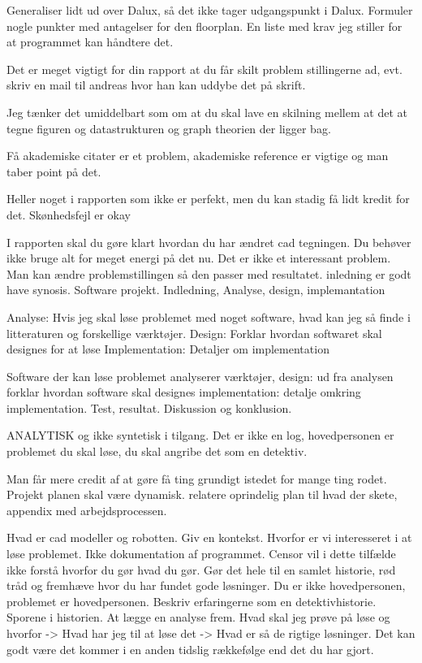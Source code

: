 Generaliser lidt ud over Dalux, så det ikke tager udgangspunkt i Dalux.
Formuler nogle punkter med antagelser for den floorplan. 
En liste med krav jeg stiller for at programmet kan håndtere det.


Det er meget vigtigt for din rapport at du får skilt problem stillingerne ad, evt. skriv en mail til andreas hvor han kan uddybe det på skrift.

Jeg tænker det umiddelbart som om at du skal lave en skilning mellem at det at tegne figuren og datastrukturen og graph theorien der ligger bag. 


Få akademiske citater er et problem, akademiske reference er vigtige og man taber point på det.

Heller noget i rapporten som ikke er perfekt, men du kan stadig få lidt kredit for det. Skønhedsfejl er okay

I rapporten skal du gøre klart hvordan du har ændret cad tegningen. Du behøver ikke bruge alt for meget energi på det nu. Det er ikke et interessant problem.
Man kan ændre problemstillingen så den passer med resultatet.
inledning er godt have synosis.
Software projekt. Indledning,  Analyse,  design, implemantation

Analyse: Hvis jeg skal løse problemet med noget software, hvad kan jeg så finde i litteraturen og forskellige værktøjer.
Design: Forklar hvordan softwaret skal designes for at løse 
Implementation: Detaljer om implementation

Software der kan løse problemet analyserer værktøjer, 
design: ud fra analysen forklar hvordan software skal designes 
implementation: detalje omkring implementation.
Test, resultat. Diskussion og konklusion.

ANALYTISK og ikke syntetisk i tilgang.
Det er ikke en log, hovedpersonen er problemet du skal løse, du skal angribe det som en detektiv. 

Man får mere credit af at gøre få ting grundigt istedet for mange ting rodet. 
Projekt planen skal være dynamisk.
relatere oprindelig plan til hvad der skete, appendix med arbejdsprocessen.

Hvad er cad modeller og robotten.
Giv en kontekst.
Hvorfor er vi interesseret i at løse problemet.
Ikke dokumentation af programmet. Censor vil i dette tilfælde ikke forstå hvorfor du gør hvad du gør.
Gør det hele til en samlet historie, rød tråd og fremhæve hvor du har fundet gode løsninger.
Du er ikke hovedpersonen, problemet er hovedpersonen. 
Beskriv erfaringerne som en detektivhistorie. 
Sporene i historien.
At lægge en analyse frem.
Hvad skal jeg prøve på løse og hvorfor -> Hvad har jeg til at løse det -> Hvad er så de rigtige løsninger.
Det kan godt være det kommer i en anden tidslig rækkefølge end det du har gjort. 

